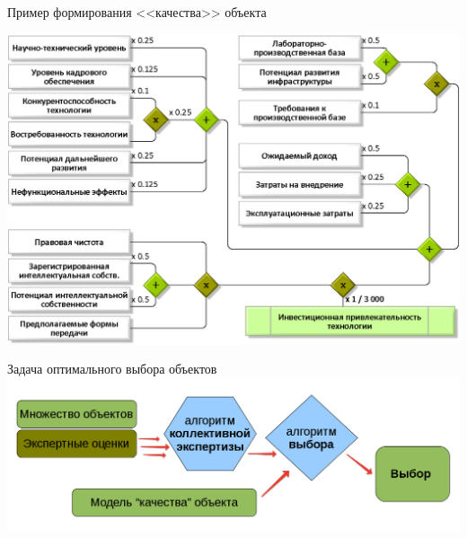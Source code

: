 \begin{frame}{Пример формирования <<качества>> объекта}
	\begin{center}
		\includegraphics[width=1.0\linewidth]{./pic/schemeF2}
	\end{center}
\end{frame} %

\begin{frame}{Задача оптимального выбора объектов}
	\includegraphics[width=0.8\linewidth]{./pic/globalscheme}
\end{frame} %



